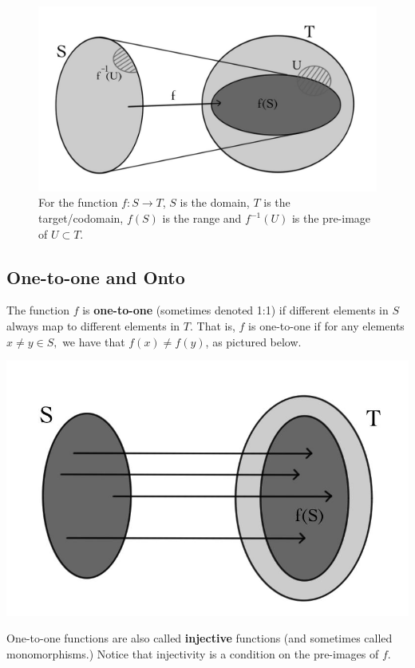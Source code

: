 \begin{figure}
\begin{center}
\includegraphics[scale=.25]{functions.jpg}
\end{center}
\caption{For the function $f:S\to T$, $S$ is the domain, $T$ is the target/codomain, $f(S)$ is the range and $f^{-1}(U)$ is the
pre-image of $U\subset T$.}
\end{figure}

\subsection{ One-to-one and Onto}
The function \(f\) is {\bfseries one-to-one} (sometimes denoted 1:1) if different elements in \(S\) always map to different elements in \(T\). That is, \(f\) is one-to-one if for any elements \(x \neq y \in S,\) we have that \(f(x) \neq f(y)\), as pictured below.
\begin{center}
\includegraphics[scale=.25]{121.jpg}
\end{center} 
One-to-one functions are also called {\bfseries injective} functions (and sometimes called monomorphisms.) Notice that injectivity is a condition on the pre-images of \(f\).

